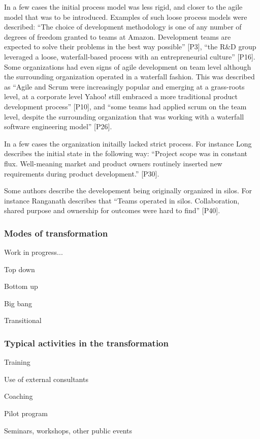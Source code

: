 \documentclass[preprint,authoryear,12pt]{elsarticle}
\begin{document}
In a few cases the initial process model was less rigid, and closer to the agile
model that was to be introduced. Examples of such loose process models were
described: ``The choice of development methodology is one of any number of
degrees of freedom granted to teams at Amazon. Development teams are expected to
solve their problems in the best way possible'' [P3], ``the R\&D group leveraged
a loose, waterfall-based process with an entrepreneurial culture'' [P16]. Some
organizations had even signs of agile development on team level although the
surrounding organization operated in a waterfall fashion. This was described as
``Agile and Scrum were increasingly popular and emerging at a grass-roots level,
at a corporate level Yahoo! still embraced a more traditional product
development process'' [P10], and ``some teams had applied scrum on the team
level, despite the surrounding organization that was working with a waterfall
software engineering model'' [P26].

In a few cases the organization initailly lacked strict process. For instance
Long describes the initial state in the following way: ``Project scope was in
constant flux. Well-meaning market and product owners routinely inserted new
requirements during product development.'' [P30].

Some authors describe the developement being originally organized in silos. For
instance Ranganath describes that ``Teams operated in silos. Collaboration,
shared purpose and ownership for outcomes were hard to find'' [P40].


\subsubsection{Modes of transformation}

Work in progress...

Top down

Bottom up

Big bang

Transitional


\subsubsection{Typical activities in the transformation}

Training

Use of external consultants

Coaching

Pilot program

Seminars, workshops, other public events
\end{document}
